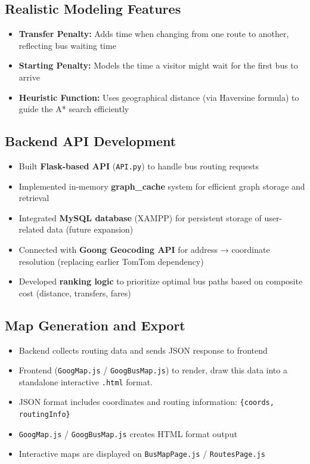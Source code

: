 \subsection{Realistic Modeling Features}

\begin{itemize}
    \item \textbf{Transfer Penalty:} Adds time when changing from one route to another, reflecting bus waiting time
    \item \textbf{Starting Penalty:} Models the time a visitor might wait for the first bus to arrive
    \item \textbf{Heuristic Function:} Uses geographical distance (via Haversine formula) to guide the A* search efficiently
\end{itemize}

\subsection{Backend API Development}

\begin{itemize}
    \item Built \textbf{Flask-based API} (\texttt{API.py}) to handle bus routing requests
    \item Implemented in-memory \textbf{graph\_cache} system for efficient graph storage and retrieval
    \item Integrated \textbf{MySQL database} (XAMPP) for persistent storage of user-related data (future expansion)
    \item Connected with \textbf{Goong Geocoding API} for address → coordinate resolution (replacing earlier TomTom dependency)
    \item Developed \textbf{ranking logic} to prioritize optimal bus paths based on composite cost (distance, transfers, fares)
\end{itemize}

\subsection{Map Generation and Export}

\begin{itemize}
    \item Backend collects routing data and sends JSON response to frontend
    \item Frontend (\texttt{GoogMap.js} / \texttt{GoogBusMap.js}) to render, draw this data into a standalone interactive \texttt{.html} format.
    \item JSON format includes coordinates and routing information: \texttt{\{coords, routingInfo\}}
    \item \texttt{GoogMap.js} / \texttt{GoogBusMap.js} creates HTML format output
    \item Interactive maps are displayed on \texttt{BusMapPage.js} / \texttt{RoutesPage.js}
\end{itemize}

